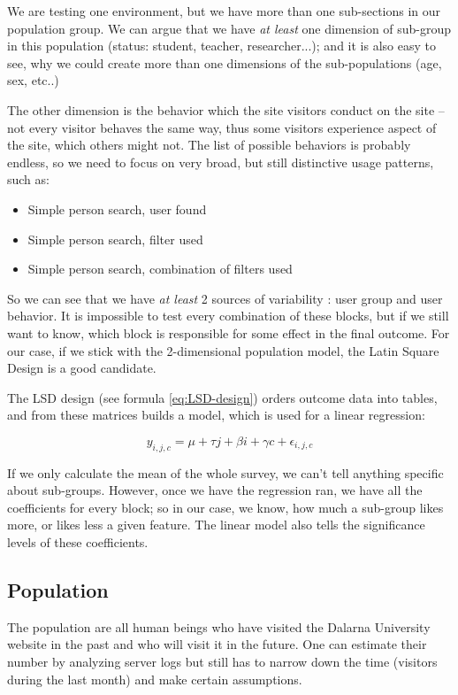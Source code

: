 \documentclass[12pt,a4paper,paper=a4,oneside,titlepage,pdftex]{scrartcl}
\begin{document}
We are testing one environment, but we have more than one sub-sections in our population group. We can argue that we have \textit{at least} one dimension of sub-group in this population (status: student, teacher, researcher...); and it is also easy to see, why we could create more than one dimensions of the sub-populations (age, sex, etc..)

The other dimension is the behavior which the site visitors conduct on the site -- not every visitor behaves the same way, thus some visitors experience aspect of the site, which others might not. The list of possible behaviors is probably endless, so we need to focus on very broad, but still distinctive usage patterns, such as:
\begin{itemize}
	\item Simple person search, user found
	\item Simple person search, filter used
	\item Simple person search, combination of filters used
\end{itemize}

So we can see that we have \textit{at least }2 sources of variability : user group and user behavior. It is impossible to test every combination of these blocks, but if we still want to know, which block is responsible for some effect in the final outcome. For our case, if we stick with the 2-dimensional population model, the Latin Square Design is a good candidate.

The LSD design (see formula \ref{eq:LSD-design}) orders outcome data into tables, and from these matrices builds a model, which is used for a linear regression:

\begin{equation}
y_{i,j,c} = \mu + \tau j + \beta i + \gamma c + \epsilon_{i,j,c}
\label{eq:LSD-design}
\end{equation}

If we only calculate the mean of the whole survey, we can't tell anything specific about sub-groups. However, once we have the regression ran, we have all the coefficients for every block; so in our case, we know, how much a sub-group likes more, or likes less a given feature. The linear model also tells the significance levels of these coefficients.

\subsection{Population}
The population are all human beings who have visited the Dalarna University website in the past and who will visit it in the future. One can estimate their number by analyzing server logs but still has to narrow down the time (visitors during the last month) and make certain assumptions.
\end{document}
